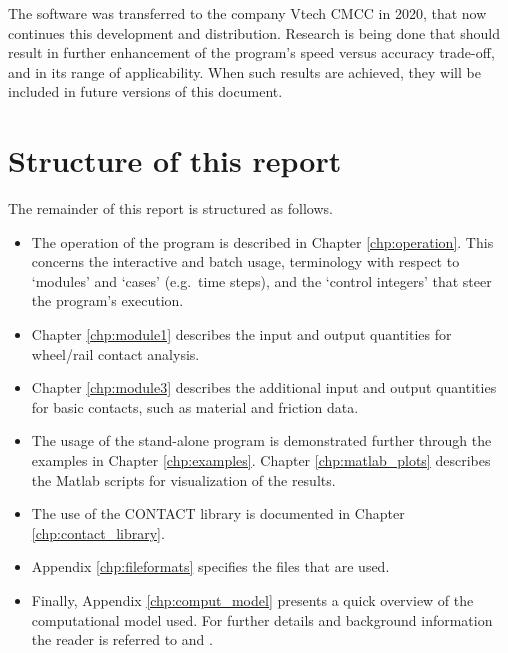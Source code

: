 \documentclass[12pt]{report}
\renewcommand{\magenta}[1]{}
\begin{document}
The software was transferred to the company Vtech CMCC in 2020, that now
continues this development and distribution.  Research is being done that
should result in further enhancement of the program's speed versus accuracy
trade-off, and in its range of applicability. When such results are
achieved, they will be included in future versions of this document.

\section{Structure of this report}

The remainder of this report is structured as follows.
\begin{itemize}
\item The operation of the program is described in Chapter
        \ref{chp:operation}. This concerns the interactive and batch usage,
        terminology with respect to `modules' and `cases' (e.g.\ time steps),
        and the `control integers' that steer the program's execution.
\item Chapter \ref{chp:module1} describes the input and output quantities
        for wheel/rail contact analysis.
\item Chapter \ref{chp:module3} describes the additional input and output
        quantities for basic contacts, such as material and friction data.
\item The usage of the stand-alone program is demonstrated further
        through the examples in Chapter \ref{chp:examples}. Chapter
        \ref{chp:matlab_plots} describes the Matlab scripts for
        visualization of the results.
\item The use of the CONTACT library is documented in Chapter
        \ref{chp:contact_library}.
\item Appendix \ref{chp:fileformats} specifies the files that are used.
\item Finally, Appendix \ref{chp:comput_model} presents a quick overview of
        the computational model used. For further details and background
        information the reader is referred to \cite{Kalker1990,Kalker2000,
        Vollebregt2020c-distr-force,Vollebregt2021a-soa-paper} and
        \cite{Vollebregt2011a-assessm}.
\end{itemize}

\magenta{
\paragraph{Experimental features}
The program has a number of `hidden' features, available only in the
development version. These are considered experimental and may be changed
or deleted in future versions. Such features are marked magenta in this
user guide.}
\end{document}
